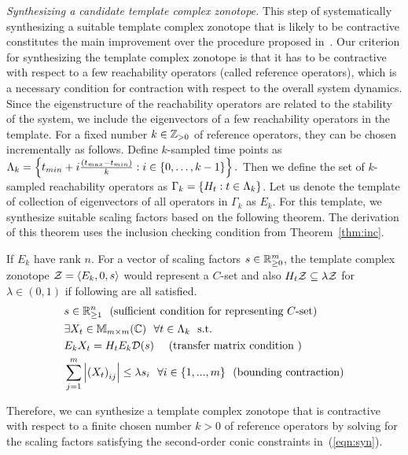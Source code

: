 \vspace{0.5em} \emph{Synthesizing a candidate template complex
  zonotope.} This step of systematically synthesizing a suitable
template complex zonotope that is likely to be contractive constitutes
the main improvement over the procedure proposed
in~\cite{arvind2016lis}. Our criterion for synthesizing the template
complex zonotope is that it has to be contractive with respect to a
few reachability operators (called reference operators), which is a
necessary condition for contraction with respect to the overall system
dynamics.  Since the eigenstructure of the reachability operators are
related to the stability of the system, we include the eigenvectors of
a few reachability operators in the template.  For a fixed number
$k\in\mathbb{Z}_{> 0}$ of reference operators, they can be chosen incrementally
as follows.  Define $k$-sampled time points as
$\Lambda_k=\left\{t_{min}+i\frac{(t_{max}-t_{min})}{k}:i\in\{0,\ldots,k-1\}\right\}.$
Then we define the set of $k$-sampled reachability operators as
$\Gamma_k=\left\{H_{t}:t\in\Lambda_k\right\}$.  Let us denote the template
of collection of eigenvectors of all operators in $\Gamma_k$ as $E_k$.
For this template, we synthesize suitable scaling factors based on the
following theorem. The derivation of this theorem uses the inclusion
checking condition from Theorem~\ref{thm:inc}.
%
\begin{thm}
If $E_k$ have rank $n$.  For a
vector of scaling factors $s\in\mathbb{R}^{m}_{\geq 0}$, the template
complex zonotope $\mathcal{Z}=\left<E_k,0,s\right>$ would represent a $C$-set and also $H_t\mathcal{Z}\subseteq
\lambda\mathcal{Z}$ for $\lambda\in(0,1)$ if
following are all satisfied.
%
\begin{equation}\label{eqn:syn}
\begin{split}
& s\in\mb{R}^n_{\geq 1}~~\text{(sufficient condition for representing $C$-set)}\\
& \exists X_t\in\mat{m}{m}{C}~~\forall t\in\Lambda_k~~\text{s.t.}\\
& E_kX_t=H_tE_k\dg(s)~~~~(\text{transfer matrix condition
    })\\%
& \sum_{j=1}^m\lt|\lt(X_t\rt)_{ij}\rt|\leq \lambda s_i~~\forall i\in\tup{m}~~\text{(bounding contraction)}\\
\end{split}
\end{equation}
\end{thm}

Therefore, we can synthesize a template complex zonotope that is
contractive with respect to a finite chosen number $k>0$ of reference
operators by solving for the scaling factors satisfying the
second-order conic constraints in~(\ref{eqn:syn}).


